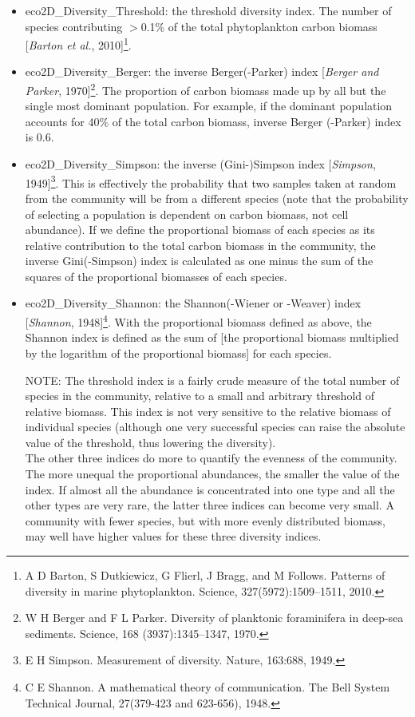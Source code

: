 \documentclass[11pt,fleqn]{book} %
\begin{document}
\begin{itemize}[noitemsep]
\begin{itemize}[noitemsep]
\item \textsf{\footnotesize eco2D\_Diversity\_Threshold}: the threshold diversity index. The number of species contributing $>$0.1\% of the total phytoplankton carbon biomass [\textit{Barton et al.}, 2010]\footnote{A D Barton, S Dutkiewicz, G Flierl, J Bragg, and M Follows. Patterns of diversity in marine phytoplankton. Science, 327(5972):1509–1511, 2010.}.
\item \textsf{\footnotesize eco2D\_Diversity\_Berger}: the inverse Berger(-Parker) index  [\textit{Berger and Parker}, 1970]\footnote{W H Berger and F L Parker. Diversity of planktonic foraminifera in deep-sea sediments. Science, 168 (3937):1345–1347, 1970.}. The proportion of carbon biomass made up by all but the single most dominant population. For example, if the dominant population accounts for 40\% of the total carbon biomass, inverse Berger (-Parker) index is 0.6. 
\item \textsf{\footnotesize eco2D\_Diversity\_Simpson}: the inverse (Gini-)Simpson index [\textit{Simpson}, 1949]\footnote{E H Simpson. Measurement of diversity. Nature, 163:688, 1949.}. This is effectively the probability that two samples taken at random from the community will be from a different species (note that the probability of selecting a population is dependent on carbon biomass, not cell abundance). If we define the proportional biomass of each species as its relative contribution to the total carbon biomass in the community, the inverse Gini(-Simpson) index is calculated as one minus the sum of the squares of the proportional biomasses of each species.
\item \textsf{\footnotesize eco2D\_Diversity\_Shannon}: the Shannon(-Wiener or -Weaver) index  [\textit{Shannon}, 1948]\footnote{C E Shannon. A mathematical theory of communication. The Bell System Technical Journal, 27(379-423 and 623-656), 1948.}. With the proportional biomass defined as above, the Shannon index is defined as the sum of [the proportional biomass multiplied by the logarithm of the proportional biomass] for each species. 
\item[NOTE:]The threshold index is a fairly crude measure of the total number of species in the community, relative to a small and arbitrary threshold of relative biomass. This index is not very sensitive to the relative biomass of individual species (although one very successful species can raise the absolute value of the threshold, thus lowering the diversity).
\\The other three indices do more to quantify the evenness of the community. The more unequal the proportional abundances, the smaller the value of the index. If almost all the abundance is concentrated into one type and all the other types are very rare, the latter three indices can become very small. A community with fewer species, but with more evenly distributed biomass, may well have higher values for these three diversity indices. 
\end{itemize}

\end{itemize}
\vspace{1mm} 
\end{document}
